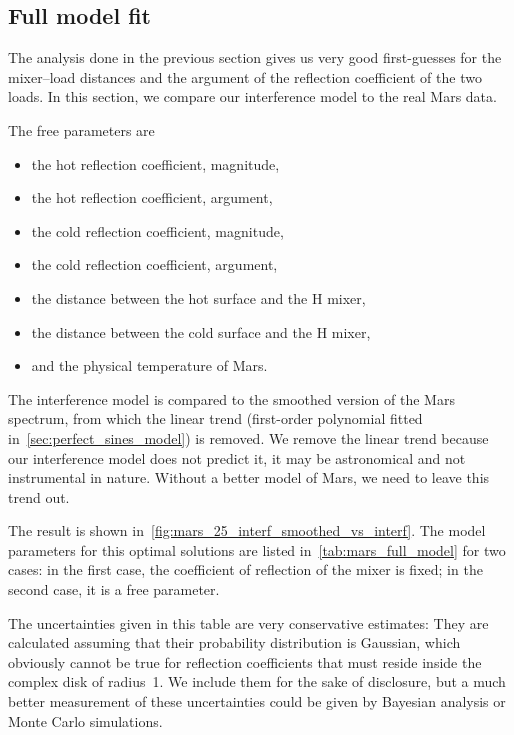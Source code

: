\begin{refsection}
\FloatBarrier



\section{Full model fit}
The analysis done in the previous section gives us very good first-guesses for the mixer--load distances and the argument of the reflection coefficient of the two loads.
In this section, we compare our interference model to the real Mars data.

The free parameters are
\begin{itemize}
    \item the hot reflection coefficient, magnitude,
    \item the hot reflection coefficient, argument,
    \item the cold reflection coefficient, magnitude,
    \item the cold reflection coefficient, argument,
    \item the distance between the hot surface and the H mixer,
    \item the distance between the cold surface and the H mixer,
    \item and the physical temperature of Mars.
\end{itemize}

The interference model is compared to the smoothed version of the Mars spectrum, from which the linear trend (first-order polynomial fitted in~\cref{sec:perfect_sines_model}) is removed.
We remove the linear trend because our interference model does not predict it, it may be astronomical and not instrumental in nature.
Without a better model of Mars, we need to leave this trend out.

The result is shown in~\cref{fig:mars_25_interf_smoothed_vs_interf}.
The model parameters for this optimal solutions are listed in~\cref{tab:mars_full_model} for two cases:
in the first case, the coefficient of reflection of the mixer is fixed;
in the second case, it is a free parameter.

The uncertainties given in this table are very conservative estimates:
They are calculated assuming that their probability distribution is Gaussian, which obviously cannot be true for reflection coefficients that must reside inside the complex disk of radius~1.
We include them for the sake of disclosure, but a much better measurement of these uncertainties could be given by Bayesian analysis or Monte Carlo simulations.


\end{refsection}

